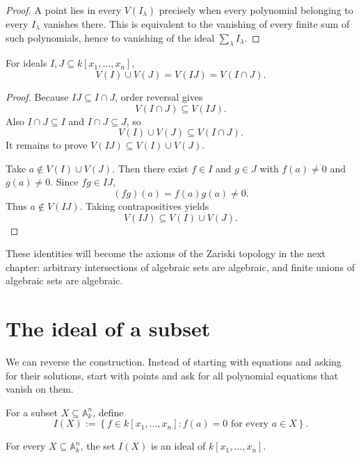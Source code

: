 \begin{proof}
A point lies in every \(V(I_\lambda)\) precisely when every polynomial belonging to every
\(I_\lambda\) vanishes there.  This is equivalent to the vanishing of every finite sum of
such polynomials, hence to vanishing of the ideal \(\sum_\lambda I_\lambda\).
\end{proof}

\begin{proposition}
\label{prop:vi01-union}
For ideals \(I,J\subseteq k[x_1,\dots,x_n]\),
\[
  V(I)\cup V(J)
  =
  V(IJ)
  =
  V(I\cap J).
\]
\end{proposition}

\begin{proof}
Because \(IJ\subseteq I\cap J\), order reversal gives
\[
  V(I\cap J)\subseteq V(IJ).
\]
Also \(I\cap J\subseteq I\) and \(I\cap J\subseteq J\), so
\[
  V(I)\cup V(J)\subseteq V(I\cap J).
\]
It remains to prove \(V(IJ)\subseteq V(I)\cup V(J)\).

Take \(a\notin V(I)\cup V(J)\).  Then there exist \(f\in I\) and \(g\in J\) with
\(f(a)\neq0\) and \(g(a)\neq0\).  Since \(fg\in IJ\),
\[
  (fg)(a)=f(a)g(a)\neq0.
\]
Thus \(a\notin V(IJ)\).  Taking contrapositives yields
\[
  V(IJ)\subseteq V(I)\cup V(J).
\]
\end{proof}

These identities will become the axioms of the Zariski topology in the next chapter:
arbitrary intersections of algebraic sets are algebraic, and finite unions of algebraic sets
are algebraic.

\section{The ideal of a subset}
\label{sec:vi01-vanishing-ideal}

We can reverse the construction.  Instead of starting with equations and asking for their
solutions, start with points and ask for all polynomial equations that vanish on them.

\begin{definition}
For a subset \(X\subseteq\mathbb A_k^n\), define
\[
  I(X)
  :=
  \left\{
    f\in k[x_1,\dots,x_n]:
    f(a)=0\text{ for every }a\in X
  \right\}.
\]
\end{definition}

\begin{proposition}
\label{prop:vi01-IX-ideal}
For every \(X\subseteq\mathbb A_k^n\), the set \(I(X)\) is an ideal of
\(k[x_1,\dots,x_n]\).
\end{proposition}

